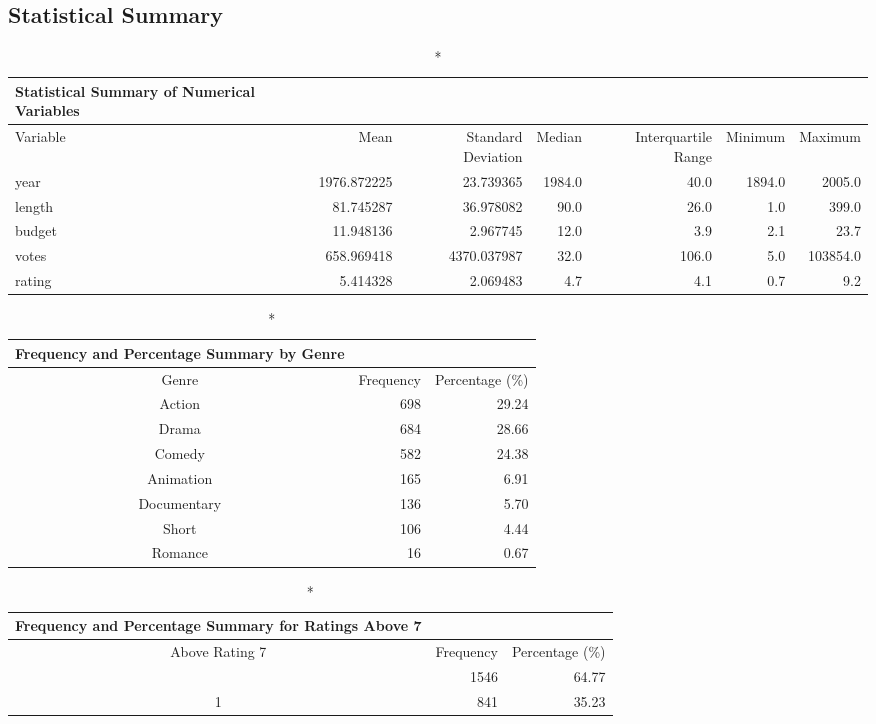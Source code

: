 \documentclass[
  11pt,
]{article}
\begin{document}
\hypertarget{statistical-summary}{%
\subsection{Statistical Summary}\label{statistical-summary}}

\begin{longtable*}{lrrrrrr}
\caption*{
{\large Statistical Summary of Numerical Variables}
} \\ 
\toprule
Variable & Mean & Standard Deviation & Median & Interquartile Range & Minimum & Maximum \\ 
\midrule\addlinespace[2.5pt]
year & 1976.872225 & 23.739365 & 1984.0 & 40.0 & 1894.0 & 2005.0 \\ 
length & 81.745287 & 36.978082 & 90.0 & 26.0 & 1.0 & 399.0 \\ 
budget & 11.948136 & 2.967745 & 12.0 & 3.9 & 2.1 & 23.7 \\ 
votes & 658.969418 & 4370.037987 & 32.0 & 106.0 & 5.0 & 103854.0 \\ 
rating & 5.414328 & 2.069483 & 4.7 & 4.1 & 0.7 & 9.2 \\ 
\bottomrule
\end{longtable*}

\begin{longtable*}{crr}
\caption*{
{\large Frequency and Percentage Summary by Genre}
} \\ 
\toprule
Genre & Frequency & Percentage (\%) \\ 
\midrule\addlinespace[2.5pt]
Action & 698 & 29.24 \\ 
Drama & 684 & 28.66 \\ 
Comedy & 582 & 24.38 \\ 
Animation & 165 & 6.91 \\ 
Documentary & 136 & 5.70 \\ 
Short & 106 & 4.44 \\ 
Romance & 16 & 0.67 \\ 
\bottomrule
\end{longtable*}

\begin{longtable*}{crr}
\caption*{
{\large Frequency and Percentage Summary for Ratings Above 7}
} \\ 
\toprule
Above Rating 7 & Frequency & Percentage (\%) \\ 
\midrule{} & 1546 & 64.77 \\ 
1 & 841 & 35.23 \\ 
\bottomrule
\end{longtable*}
\end{document}
